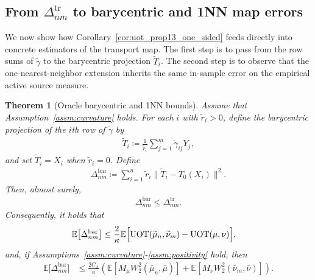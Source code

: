 \documentclass[11pt,reqno]{amsart}
\newtheorem{theorem}{Theorem}
\theoremstyle{definition}
\renewcommand{\tilde}{\widetilde}
\newcommand{\Ep}{\mathbb{E}}
\begin{document}
\subsection{From $\Delta_{nm}^{\mathrm{tr}}$ to barycentric and 1NN map errors}

We now show how Corollary~\ref{cor:uot_prop13_one_sided} feeds directly into concrete estimators of the transport map.
The first step is to pass from the row sums of $\tilde\gamma$ to the barycentric projection $\tilde T_i$.
The second step is to observe that the one-nearest-neighbor extension inherits the same in-sample error on the empirical active source measure.

\begin{theorem}[Oracle barycentric and 1NN bounds]
\label{thm:uot_barycentric_and_1nn_in_sample}
Assume that Assumption~\ref{assm:curvature} holds.
For each $i$ with $\tilde r_i>0$, define the barycentric projection of the $i$th row of $\tilde\gamma$ by
\begin{align}
    \tilde T_i \coloneqq \frac{1}{\tilde r_i}\sum_{j=1}^m \tilde\gamma_{ij}Y_j,
\end{align}
and set $\tilde T_i=X_i$ when $\tilde r_i=0$.
Define
\begin{align}
    \Delta_{nm}^{\mathrm{bar}}
    \coloneqq
    \sum_{i=1}^n \tilde r_i  \|\tilde T_i-T_0(X_i)\|^2.
\end{align}
Then, almost surely,
\begin{align}
\label{eq:uot_barycentric_delta_leq_transport_delta}
    \Delta_{nm}^{\mathrm{bar}}
    \le
    \Delta_{nm}^{\mathrm{tr}}.
\end{align}
Consequently, it holds that
\begin{align}
\label{eq:uot_barycentric_expectation_bound}
    \Ep\bigl[\Delta_{nm}^{\mathrm{bar}}\bigr]
    &\le
    \frac{2}{\kappa}
    \Ep\Bigl[
        \mathrm{UOT}(\tilde\mu_n,\tilde\nu_m)-\mathrm{UOT}(\mu,\nu)
    \Bigr],
\end{align}
and, if Assumptions~\ref{assm:curvature}-\ref{assm:positivity} hold, then
\begin{align}
\label{eq:uot_barycentric_rate_bound}
    \Ep\bigl[\Delta_{nm}^{\mathrm{bar}}\bigr]
    &\le
    \frac{2C_\Lambda}{\kappa}
    \left(
        \Ep[M_\mu W_2^2(\bar\mu_n,\bar\mu)] + \Ep[M_\nu W_2^2(\bar\nu_m,\bar\nu)]
    \right).
\end{align}


\end{theorem}
\end{document}

